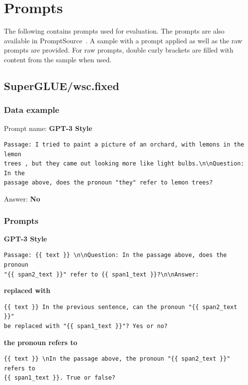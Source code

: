 \documentclass[twoside,11pt]{article}
\begin{document}
\vskip 0.2in


\appendix

\section{Prompts}\label{app:mt-app}

The following contains prompts used for evaluation. The prompts are also available in PromptSource~\citep{bach2022promptsource}. A sample with a prompt applied as well as the raw prompts are provided. For raw prompts, double curly brackets are filled with content from the sample when used.

\localtableofcontents

\subsection{SuperGLUE/wsc.fixed}

\subsubsection{Data example}

Prompt name: \textbf{GPT-3 Style}
\begin{verbatim}
Passage: I tried to paint a picture of an orchard, with lemons in the lemon 
trees , but they came out looking more like light bulbs.\n\nQuestion: In the 
passage above, does the pronoun "they" refer to lemon trees?
\end{verbatim}
Answer: \textbf{No}

\subsubsection{Prompts}

\textbf{GPT-3 Style}
\begin{verbatim}
Passage: {{ text }} \n\nQuestion: In the passage above, does the pronoun 
"{{ span2_text }}" refer to {{ span1_text }}?\n\nAnswer:
\end{verbatim}

\noindent\textbf{replaced with}
\begin{verbatim}
{{ text }} In the previous sentence, can the pronoun "{{ span2_text }}" 
be replaced with "{{ span1_text }}"? Yes or no?
\end{verbatim}

\noindent\textbf{the pronoun refers to}
\begin{verbatim}
{{ text }} \nIn the passage above, the pronoun "{{ span2_text }}" refers to 
{{ span1_text }}. True or false?
\end{verbatim}
\end{document}

